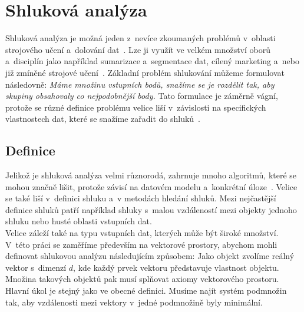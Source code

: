 \chapter{Shluková analýza} \label{sec:clusteranalysis}
Shluková analýza je možná jeden z~nevíce zkoumaných problémů v~oblasti strojového učení a~dolování dat~\cite{Aggarwal13}. Lze ji využít ve velkém množství oborů a~disciplín jako například sumarizace a~segmentace dat, cílený marketing a~nebo již zmíněné strojové učení~\cite{Jain10, Kaufman90}. Základní problém shlukování můžeme formulovat následovně: \textit{Máme množinu vstupních bodů, snažíme se je rozdělit tak, aby skupiny obsahovaly co nejpodobnější body.} Tato formulace je záměrně vágní, protože se různé definice problému velice liší v~závislosti na specifických vlastnostech dat, které se snažíme zařadit do shluků~\cite{Aggarwal13}. 

\section{Definice}
Jelikož je shluková analýza velmi různorodá, zahrnuje mnoho algoritmů, které se mohou značně lišit, protože závisí na datovém modelu a~konkrétní úloze~\cite{Aggarwal13}. Velice se také liší v~definici shluku a~v metodách hledání shluků. Mezi nejčastější definice shluků patří například shluky s~malou vzdá\-le\-nos\-tí mezi objekty jednoho shluku nebo husté oblasti vstupních dat.\\

Velice záleží také na typu vstupních dat, kterých může být široké množství. V~této práci se zaměříme především na vektorové prostory, abychom mohli definovat shlukovou analýzu následujícím způsobem: Jako objekt zvolíme reálný vektor s~dimenzí $d$, kde každý prvek vektoru představuje vlastnost objektu. Množina takových objektů pak musí splňovat axiomy vektorového prostoru. Hlavní úkol je stejný jako ve obecné definici. Musíme najít systém podmnožin tak, aby vzdálenosti mezi vektory v~jedné podmnožině byly minimální.


